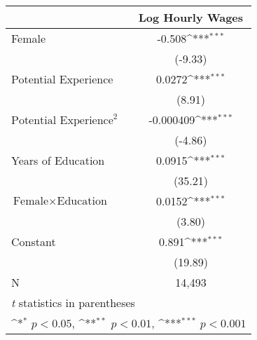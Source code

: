 {
\def\sym#1{\ifmmode^{#1}\else\(^{#1}\)\fi}
\begin{tabular}{l*{1}{c}}
\hline\hline
          &\multicolumn{1}{c}{Log Hourly Wages}\\
\hline
Female    &   -0.508\sym{***}\\
          &  (-9.33)         \\
Potential Experience&   0.0272\sym{***}\\
          &   (8.91)         \\
$\text{Potential Experience}^2$&-0.000409\sym{***}\\
          &  (-4.86)         \\
Years of Education&   0.0915\sym{***}\\
          &  (35.21)         \\
$\text{Female}\times \text{Education}$&   0.0152\sym{***}\\
          &   (3.80)         \\
Constant  &    0.891\sym{***}\\
          &  (19.89)         \\
\hline
N         &   14,493         \\
\hline\hline
\multicolumn{2}{l}{\footnotesize \textit{t} statistics in parentheses}\\
\multicolumn{2}{l}{\footnotesize \sym{*} \(p<0.05\), \sym{**} \(p<0.01\), \sym{***} \(p<0.001\)}\\
\end{tabular}
}
